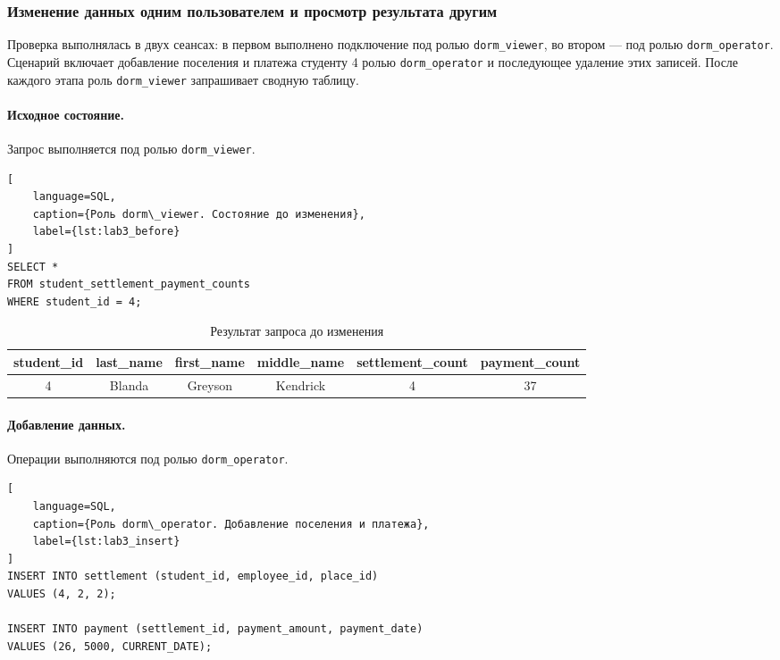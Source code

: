 \subsubsection{Изменение данных одним пользователем и просмотр результата другим}

Проверка выполнялась в двух сеансах: в первом выполнено подключение под ролью \texttt{dorm\_viewer}, во втором --- под ролью \texttt{dorm\_operator}. Сценарий включает добавление поселения и платежа студенту 4 ролью \texttt{dorm\_operator} и последующее удаление этих записей. После каждого этапа роль \texttt{dorm\_viewer} запрашивает сводную таблицу.

\paragraph{Исходное состояние.} Запрос выполняется под ролью \texttt{dorm\_viewer}.

\begin{lstlisting}[
    language=SQL,
    caption={Роль dorm\_viewer. Состояние до изменения},
    label={lst:lab3_before}
]
SELECT *
FROM student_settlement_payment_counts
WHERE student_id = 4;
\end{lstlisting}

\begin{table}[H]
\centering
\caption{Результат запроса до изменения}
\label{tab:lab3_before}
\small
\begin{tabular}{|c|c|c|c|c|c|}
\hline
\textbf{student\_id} & \textbf{last\_name} & \textbf{first\_name} & \textbf{middle\_name} & \textbf{settlement\_count} & \textbf{payment\_count} \\ \hline
4 & Blanda & Greyson & Kendrick & 4 & 37 \\ \hline
\end{tabular}
\end{table}

\paragraph{Добавление данных.} Операции выполняются под ролью \texttt{dorm\_operator}.

\begin{lstlisting}[
    language=SQL,
    caption={Роль dorm\_operator. Добавление поселения и платежа},
    label={lst:lab3_insert}
]
INSERT INTO settlement (student_id, employee_id, place_id)
VALUES (4, 2, 2);

INSERT INTO payment (settlement_id, payment_amount, payment_date)
VALUES (26, 5000, CURRENT_DATE);
\end{lstlisting}

